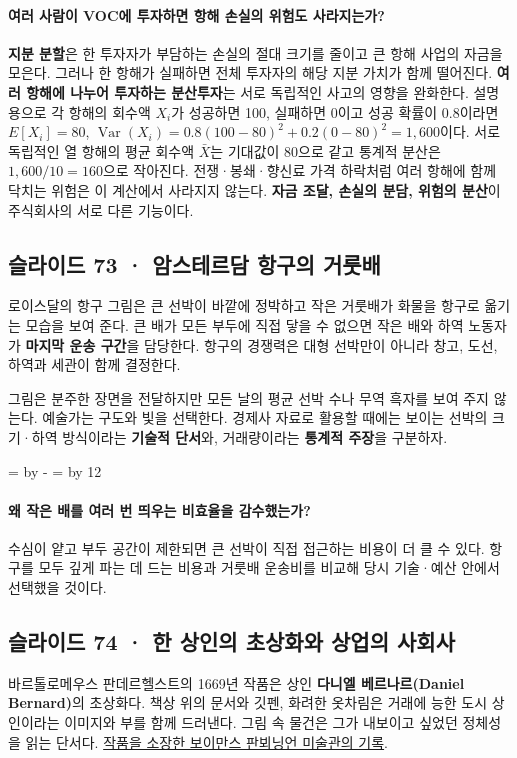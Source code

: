 \documentclass[10pt,a4paper]{article}
\newcommand{\ReserveQuestionSpace}{%
  \par\begingroup
  \dimen0=\pagegoal \advance\dimen0 by -\pagetotal
  \dimen2=\baselineskip \multiply\dimen2 by 12
  \ifdim\dimen0<\dimen2 \newpage\fi
  \endgroup}
\begin{document}
\paragraph{여러 사람이 VOC에 투자하면 항해 손실의 위험도 사라지는가?}
\textbf{지분 분할}은 한 투자자가 부담하는 손실의 절대 크기를 줄이고 큰 항해 사업의 자금을 모은다. 그러나 한 항해가 실패하면 전체 투자자의 해당 지분 가치가 함께 떨어진다. \textbf{여러 항해에 나누어 투자하는 분산투자}는 서로 독립적인 사고의 영향을 완화한다. 설명용으로 각 항해의 회수액 $X_i$가 성공하면 100, 실패하면 0이고 성공 확률이 0.8이라면 $E[X_i]=80$, $\operatorname{Var}(X_i)=0.8(100-80)^2+0.2(0-80)^2=1{,}600$이다. 서로 독립적인 열 항해의 평균 회수액 $\bar X$는 기대값이 80으로 같고 통계적 분산은 $1{,}600/10=160$으로 작아진다. 전쟁·봉쇄·향신료 가격 하락처럼 여러 항해에 함께 닥치는 위험은 이 계산에서 사라지지 않는다. \textbf{자금 조달, 손실의 분담, 위험의 분산}이 주식회사의 서로 다른 기능이다.\par

\subsection{슬라이드 73 · 암스테르담 항구의 거룻배}
로이스달의 항구 그림은 큰 선박이 바깥에 정박하고 작은 거룻배가 화물을 항구로 옮기는 모습을 보여 준다. 큰 배가 모든 부두에 직접 닿을 수 없으면 작은 배와 하역 노동자가 \textbf{마지막 운송 구간}을 담당한다. 항구의 경쟁력은 대형 선박만이 아니라 창고, 도선, 하역과 세관이 함께 결정한다.\par

그림은 분주한 장면을 전달하지만 모든 날의 평균 선박 수나 무역 흑자를 보여 주지 않는다. 예술가는 구도와 빛을 선택한다. 경제사 자료로 활용할 때에는 보이는 선박의 크기·하역 방식이라는 \textbf{기술적 단서}와, 거래량이라는 \textbf{통계적 주장}을 구분하자.\par

\ReserveQuestionSpace
\paragraph{왜 작은 배를 여러 번 띄우는 비효율을 감수했는가?}
수심이 얕고 부두 공간이 제한되면 큰 선박이 직접 접근하는 비용이 더 클 수 있다. 항구를 모두 깊게 파는 데 드는 비용과 거룻배 운송비를 비교해 당시 기술·예산 안에서 선택했을 것이다.\par

\subsection{슬라이드 74 · 한 상인의 초상화와 상업의 사회사}
바르톨로메우스 판데르헬스트의 1669년 작품은 상인 \textbf{다니엘 베르나르(Daniel Bernard)}의 초상화다. 책상 위의 문서와 깃펜, 화려한 옷차림은 거래에 능한 도시 상인이라는 이미지와 부를 함께 드러낸다. 그림 속 물건은 그가 내보이고 싶었던 정체성을 읽는 단서다. \href{https://www.boijmans.nl/collectie/kunstwerken/1888/portret-van-daniel-bernard}{작품을 소장한 보이만스 판뵈닝언 미술관의 기록}.\par
\end{document}
